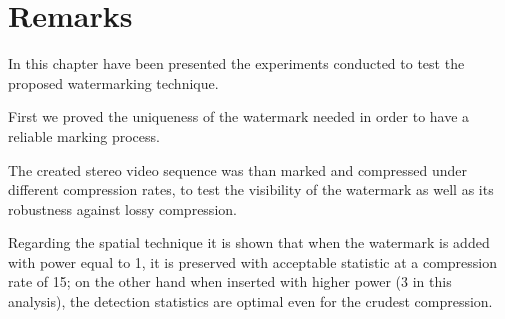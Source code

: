 \begin{table}[htbp]
\begin{center}
\caption{ \label{tab:psnr_wm}}
\end{center}
\end{table}

\section{Remarks}

In this chapter have been presented the experiments conducted to test the proposed watermarking technique.

First we proved the uniqueness of the watermark needed in order to have a reliable marking process.

The created stereo video sequence was than marked and compressed under different compression rates, to test the visibility of the watermark as well as its robustness against lossy compression.

Regarding the spatial technique it is shown that when the watermark is added with power equal to 1, it is preserved with acceptable statistic at a compression rate of 15; on the other hand when inserted with higher power (3 in this analysis), the detection statistics are optimal even for the crudest compression. 

